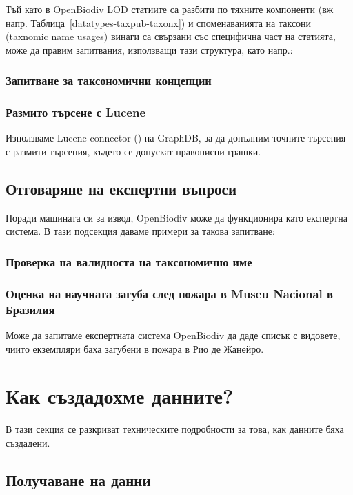 Тъй като в OpenBiodiv LOD статиите са разбити по тяхните компоненти (вж напр. Таблица~\ref{datatypes-taxpub-taxonx}) и споменаванията на таксони (taxnomic name usages) винаги са свързани със специфична част на статията, може да правим запитвания, използващи тази структура, като напр.:

\subsubsection{Запитване за таксономични концепции}

\subsubsection{Размито търсене с Lucene}

Използваме Lucene connector (\cite{ontotext_graphdb_2018}) на GraphDB, за да допълним точните търсения с размити търсения, където се допускат правописни грашки.

\subsection{Отговаряне на експертни въпроси}

Поради машината си за извод, OpenBiodiv може да функционира като експертна система. В тази подсекция даваме примери за такова запитване:

\subsubsection{Проверка на валидноста на таксономично име}

\subsubsection{Оценка на научната загуба след пожара в Museu Nacional в Бразилия}

Може да запитаме експертната система OpenBiodiv да даде списък с видовете, чиито екземпляри баха загубени в пожара в Рио де Жанейро.

\section{Как създадохме данните?}

В тази секция се разкриват техническите подробности за това, как данните бяха създадени.

\subsection{Получаване на данни}

